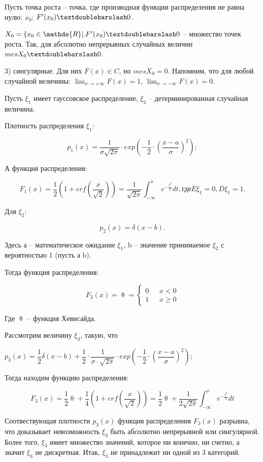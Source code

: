 Пусть точка роста -- точка, где производная функции распределения не равна нулю: $x_0$: $F'(x_0) \textdoublebarslash 0$.

$X_0 = \{x_0 \in \mathds{R}|_: F'(x_0) \textdoublebarslash 0$ -- множество точек роста. Так, для абсолютно непрерывных случайных величин $mesX_0 \textdoublebarslash 0$.

3) сингулярные. Для них $F(x) \in C$, но $mesX_0 = 0$. Напомним, что для любой случайной величины: $\lim_{x\to +\infty}F(x) = 1$, $\lim_{x\to -\infty} F(x) = 0$.

Пусть $\xi_1$ имеет гауссовское распределение, $\xi_2$ -- детерминированная случайная величина. 

Плотность распределения $\xi_1$:

$$p_1(x) = \dfrac{1}{\sigma \sqrt{2\pi}} \cdot exp \left( -\dfrac{1}{2} \cdot \left(\dfrac{x - a}{\sigma}\right)^2\right);$$

А функция распределения:

$$F_1(x) = \dfrac{1}{2} \left(1 + erf\left(\dfrac{x}{\sqrt{2}}\right)\right) = \dfrac{1}{\sqrt{2\pi}} \int_{- \infty}^{x} e^{-\frac{t^2}{2}} dt, \text{где} E\xi_1 = 0, D\xi_1 = 1.$$

Для $\xi_2$:

$$p_2(x) = \delta(x-b).$$

Здесь а -- математическое ожидание $\xi_1$, b -- значение принимаемое $\xi_2$ с вероятностью 1 (пусть а \textdoublebarslash b).

Тогда функция распределения:

\begin{equation*}
F_2(x) = \uptheta = 
 \begin{cases}
   0 &\text{ $x < 0$}\\
   1 &\text{ $x \geq 0$}
 \end{cases}
\end{equation*}

Где $\uptheta$ -- функция Хевисайда.

Рассмотрим величину $\xi_3$, такую, что 

$p_3(x) = \dfrac{1}{2} \delta(x-b) + \dfrac{1}{2} \cdot \dfrac{1}{\sigma \cdot \sqrt{2\pi}} \cdot exp \left( -\dfrac{1}{2} \cdot \left(\dfrac{x - a}{\sigma}\right)^2 \right)$;

Тогда находим функцию распределения:

$$F_3(x) = \dfrac{1}{2} \uptheta + \dfrac{1}{4} \left(1 + erf\left(\dfrac{x} {\sqrt{2}}\right)\right) = \dfrac{1}{2} \uptheta + \dfrac{1}{2\sqrt{2\pi}} \int_{- \infty}^{x} e^{-\frac{t^2}{2}} dt$$

Соотвествующая плотности $p_3(x)$ функция распределения $F_3(x)$ разрывна, что доказывает невозможность $\xi_3$ быть абсолютно непрерывной или сингулярной. Более того, $\xi_3$ имеет множество значений, которое ни конечно, ни счетно, а значит $\xi_3$ не дискретная. Итак, $\xi_3$ не принадлежит ни одной из 3 категорий. 


